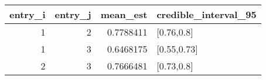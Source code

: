 \begin{longtable}{rrrl}
\toprule
entry\_i & entry\_j & mean\_est & credible\_interval\_95 \\ 
\midrule
1 & 2 & 0.7788411 & [0.76,0.8] \\ 
1 & 3 & 0.6468175 & [0.55,0.73] \\ 
2 & 3 & 0.7666481 & [0.73,0.8] \\ 
\bottomrule
\end{longtable}

